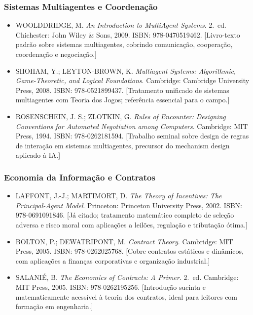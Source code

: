 \subsubsection*{Sistemas Multiagentes e Coordenação}

\begin{itemize}
    \item WOOLDDRIDGE, M. \textit{An Introduction to MultiAgent Systems}. 2.~ed. Chichester: John Wiley \& Sons, 2009. ISBN: 978-0470519462. [Livro-texto padrão sobre sistemas multiagentes, cobrindo comunicação, cooperação, coordenação e negociação.]
    
    \item SHOHAM, Y.; LEYTON-BROWN, K. \textit{Multiagent Systems: Algorithmic, Game-Theoretic, and Logical Foundations}. Cambridge: Cambridge University Press, 2008. ISBN: 978-0521899437. [Tratamento unificado de sistemas multiagentes com Teoria dos Jogos; referência essencial para o campo.]
    
    \item ROSENSCHEIN, J. S.; ZLOTKIN, G. \textit{Rules of Encounter: Designing Conventions for Automated Negotiation among Computers}. Cambridge: MIT Press, 1994. ISBN: 978-0262181594. [Trabalho seminal sobre design de regras de interação em sistemas multiagentes, precursor do mechanism design aplicado à IA.]
\end{itemize}

\subsubsection*{Economia da Informação e Contratos}

\begin{itemize}
    \item LAFFONT, J.-J.; MARTIMORT, D. \textit{The Theory of Incentives: The Principal-Agent Model}. Princeton: Princeton University Press, 2002. ISBN: 978-0691091846. [Já citado; tratamento matemático completo de seleção adversa e risco moral com aplicações a leilões, regulação e tributação ótima.]
    
    \item BOLTON, P.; DEWATRIPONT, M. \textit{Contract Theory}. Cambridge: MIT Press, 2005. ISBN: 978-0262025768. [Cobre contratos estáticos e dinâmicos, com aplicações a finanças corporativas e organização industrial.]
    
    \item SALANIÉ, B. \textit{The Economics of Contracts: A Primer}. 2.~ed. Cambridge: MIT Press, 2005. ISBN: 978-0262195256. [Introdução sucinta e matematicamente acessível à teoria dos contratos, ideal para leitores com formação em engenharia.]
\end{itemize}

